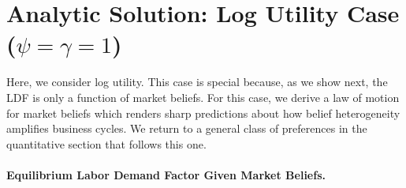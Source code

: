 \section{Analytic Solution: Log Utility Case ($\psi = \gamma = 1$)}\label{sec:log_utility.sec} %

Here, we consider log utility. This case is special because, as we show next, the LDF is only a function of market beliefs. %
For this case, we derive a law of motion for market beliefs which renders sharp predictions about how belief heterogeneity amplifies business cycles. We return to a general class of preferences in the quantitative section that follows this one.

\paragraph{Equilibrium Labor Demand Factor Given Market Beliefs.}

